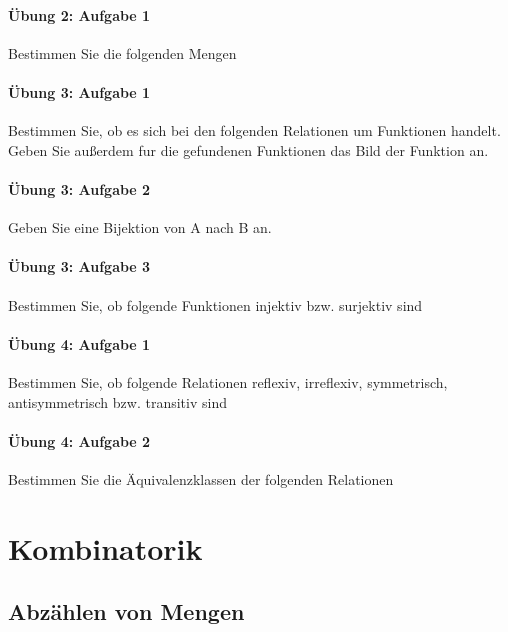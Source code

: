 \documentclass
[
  draft    = true,
  fontsize = 11pt,
  parskip  = half-,
  BCOR     = 0pt,
  DIV      = 11,
  ngerman,
  dvipsnames
]
{scrartcl}
\begin{document}
\paragraph{Übung 2: Aufgabe 1}
Bestimmen Sie die folgenden Mengen

\paragraph{Übung 3: Aufgabe 1}
Bestimmen Sie, ob es sich bei den folgenden Relationen um Funktionen
handelt. Geben Sie außerdem fur die gefundenen Funktionen das Bild der
Funktion an.

\paragraph{Übung 3: Aufgabe 2}
Geben Sie eine Bijektion von A nach B an.

\paragraph{Übung 3: Aufgabe 3}
Bestimmen Sie, ob folgende Funktionen injektiv bzw. surjektiv sind

\paragraph{Übung 4: Aufgabe 1}
Bestimmen Sie, ob folgende Relationen reflexiv, irreflexiv, symmetrisch,
antisymmetrisch bzw. transitiv sind

\paragraph{Übung 4: Aufgabe 2}
Bestimmen Sie die Äquivalenzklassen der folgenden Relationen

\section{Kombinatorik}

\subsection{Abzählen von Mengen}
\end{document}
